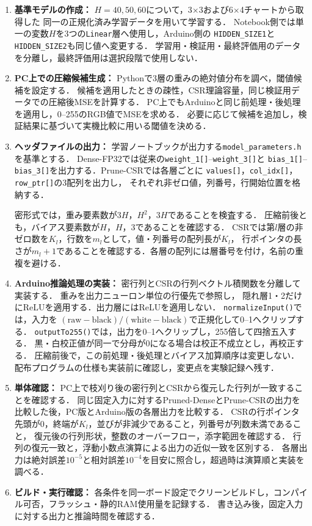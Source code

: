 \documentclass[a4paper,11pt]{article}
\begin{document}
\begin{enumerate}
  \item \textbf{基準モデルの作成：}
    $H=40,50,60$について，3$\times$3および6$\times$4チャートから取得した
    同一の正規化済み学習データを用いて学習する．
    Notebook側では単一の変数$H$を3つの\texttt{Linear}層へ使用し，Arduino側の
    \texttt{HIDDEN\_SIZE1}と\texttt{HIDDEN\_SIZE2}も同じ値へ変更する．
    学習用・検証用・最終評価用のデータを分離し，最終評価用は選択段階で使用しない．
  \item \textbf{PC上での圧縮候補生成：}
    Pythonで3層の重みの絶対値分布を調べ，閾値候補を設定する．
    候補を適用したときの疎性，CSR理論容量，同じ検証用データでの圧縮後MSEを計算する．
    PC上でもArduinoと同じ前処理・後処理を適用し，0--255のRGB値でMSEを求める．
    必要に応じて候補を追加し，検証結果に基づいて実機比較に用いる閾値を決める．
  \item \textbf{ヘッダファイルの出力：}
    学習ノートブックが出力する\texttt{model\_parameters.h}を基準とする．
    Dense-FP32では従来の\texttt{weight\_1[]}--\texttt{weight\_3[]}と
    \texttt{bias\_1[]}--\texttt{bias\_3[]}を出力する．Prune-CSRでは各層ごとに
    \texttt{values[]}，\texttt{col\_idx[]}，\texttt{row\_ptr[]}の3配列を出力し，
    それぞれ非ゼロ値，列番号，行開始位置を格納する．

    密形式では，重み要素数が$3H$，$H^2$，$3H$であることを検査する．
    圧縮前後とも，バイアス要素数が$H$，$H$，3であることを確認する．
    CSRでは第$l$層の非ゼロ数を$K_l$，行数を$m_l$として，値・列番号の配列長が$K_l$，
    行ポインタの長さが$m_l+1$であることを確認する．各層の配列には層番号を付け，名前の重複を避ける．
  \item \textbf{Arduino推論処理の実装：}
    密行列とCSRの行列ベクトル積関数を分離して実装する．
    重みを出力ニューロン単位の行優先で参照し，
    隠れ層1・2だけにReLUを適用する．出力層にはReLUを適用しない．
    \texttt{normalizeInput()}では，入力を
    $(\mathrm{raw}-\mathrm{black})/(\mathrm{white}-\mathrm{black})$で正規化して0--1へクリップする．
    \texttt{outputTo255()}では，出力を0--1へクリップし，255倍して四捨五入する．
    黒・白校正値が同一で分母が0になる場合は校正不成立とし，再校正する．
    圧縮前後で，この前処理・後処理とバイアス加算順序は変更しない．
    配布プログラムの仕様も実装前に確認し，変更点を実験記録へ残す．
  \item \textbf{単体確認：}
    PC上で枝刈り後の密行列とCSRから復元した行列が一致することを確認する．
    同じ固定入力に対するPruned-DenseとPrune-CSRの出力を比較した後，PC版とArduino版の各層出力を比較する．
    CSRの行ポインタ先頭が0，終端が$K_l$，並びが非減少であること，列番号が列数未満であること，
    復元後の行列形状，整数のオーバーフロー，添字範囲を確認する．
    行列の復元一致と，浮動小数点演算による出力の近似一致を区別する．
    各層出力は絶対誤差$10^{-5}$と相対誤差$10^{-4}$を目安に照合し，超過時は演算順と実装を調べる．
  \item \textbf{ビルド・実行確認：}
    各条件を同一ボード設定でクリーンビルドし，コンパイル可否，フラッシュ・静的RAM使用量を記録する．
    書き込み後，固定入力に対する出力と推論時間を確認する．
\end{enumerate}
\end{document}
